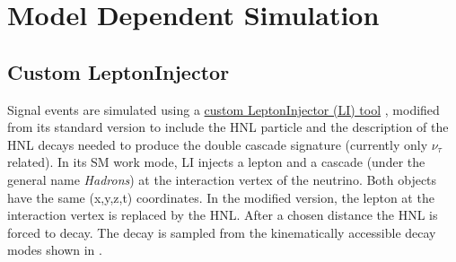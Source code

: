 



\section{Model Dependent Simulation} 



\subsection{Custom LeptonInjector} 

Signal events are simulated using a \href{https://github.com/LeanderFischer/LeptonInjector-HNL/tree/main/LeptonInjector}{custom LeptonInjector (LI) tool} , modified from its standard version to include the HNL particle and the description of the HNL decays needed to produce the double cascade signature (currently only $\nu_{\tau}$ related). In its SM work mode, LI injects a lepton and a cascade (under the general name \textit{Hadrons}) at the interaction vertex of the neutrino. Both objects have the same (x,y,z,t) coordinates. In the modified version, the lepton at the interaction vertex is replaced by the HNL. After a chosen distance the HNL is forced to decay. The decay is sampled from the kinematically accessible decay modes shown in .


